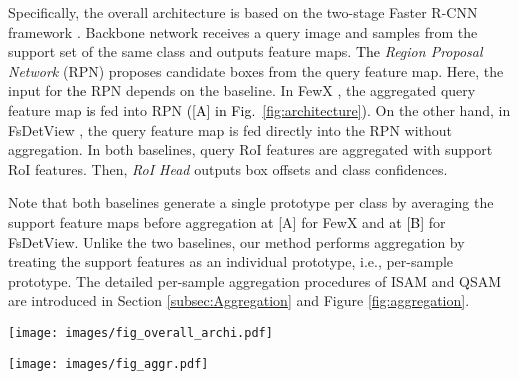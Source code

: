 \documentclass[10pt,twocolumn,letterpaper]{article}
\newcommand{\nj}[1]{\textcolor{black}{#1}}
\newcommand{\hj}[1]{\textcolor{black}{#1}}
\begin{document}
Specifically, the overall architecture is based on the two-stage Faster R-CNN framework \cite{ren2015faster}. Backbone network receives a query image and  samples from the support set of the same class and outputs  feature maps. \nj{The} \textit{Region Proposal Network} (RPN) proposes candidate boxes from the query feature map. Here, the input for \nj{the} RPN depends on the baseline. In FewX \cite{fan2020fsod}, the aggregated query feature map \hj{is} fed into RPN \nj{([A] in Fig.~\ref{fig:architecture})}. On the other hand, in FsDetView \cite{xiao2020few}, the query feature map is fed directly into the RPN without aggregation. In both baselines,  query RoI features are aggregated with  support RoI features. Then, \textit{RoI Head} outputs box offsets and class confidences. 

Note that both baselines \cite{fan2020fsod, xiao2020few} generate a single prototype per class by averaging the support feature maps before aggregation \nj{at} [A] for FewX and \nj{at [B]} for FsDetView. Unlike the two baselines, our method performs aggregation by treating the support features as an individual prototype, i.e., per-sample prototype. The detailed per-sample aggregation procedures of ISAM and QSAM are introduced in Section \ref{subsec:Aggregation} and Figure \ref{fig:aggregation}.


\begin{figure*}
\centering
\texttt{[image: images/fig\_overall\_archi.pdf]}
\vspace{-0.1cm}
\caption{\textbf{\nj{Our} overall Architecture} based on Faster R-CNN \cite{ren2015faster} to find instances of support category in the query image. [A] and [B] are aggregation procedure (Fig. \ref{fig:aggregation}) for the query feature and the support features. Baselines are FewX \cite{fan2020fsod} and FsDetView \cite{xiao2020few}, where FewX has both [A] and [B] operations, and in FsDetView, query features are directly fed into RPN without aggregation of [A] operation.}

\label{fig:architecture}
\end{figure*}


\begin{figure*}
\centering
\texttt{[image: images/fig\_aggr.pdf]}
\vspace{-0.1cm}
\caption{Two types of aggregation procedures (3-shot example) of the query feature maps and  support feature maps. (a) is for spatial attention to the query feature map and (b) is for aggregation of  query feature maps and  support feature maps.}
\label{fig:aggregation}
\end{figure*}
\end{document}
